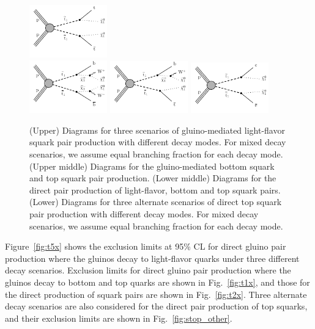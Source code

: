 \begin{figure}[htbp]
    \includegraphics[width=0.3\textwidth]{figs/results/T2tt.pdf} \\
    \includegraphics[width=0.3\textwidth]{figs/results/T2bW.pdf}
    \includegraphics[width=0.3\textwidth]{figs/results/T2bt.pdf}
    \includegraphics[width=0.3\textwidth]{figs/results/T2cc.pdf} \\
    \caption{(Upper) Diagrams for three scenarios of gluino-mediated light-flavor squark pair production with different decay modes.
    For mixed decay scenarios, we assume equal branching fraction for each decay mode.
    (Upper middle) Diagrams for the gluino-mediated bottom squark and top squark pair production.
      (Lower middle) Diagrams for the direct pair production of light-flavor, bottom and top squark pairs.
      (Lower) Diagrams for three alternate scenarios of direct top squark pair production with different decay modes.
      For mixed decay scenarios, we assume equal branching fraction for each decay mode.}
    \label{fig:SMS_susy}
\end{figure}

Figure~\ref{fig:t5x} shows the exclusion limits at 95\% CL for direct gluino pair production where the
gluinos decay to light-flavor quarks under three different decay scenarios. Exclusion limits for
direct gluino pair production where the gluinos decay to bottom and top quarks are shown in
Fig.~\ref{fig:t1x}, and those for the direct production of squark pairs are shown in Fig.~\ref{fig:t2x}. Three alternate
decay scenarios are also considered for the direct pair production of top squarks, and their
exclusion limits are shown in Fig.~\ref{fig:stop_other}.

